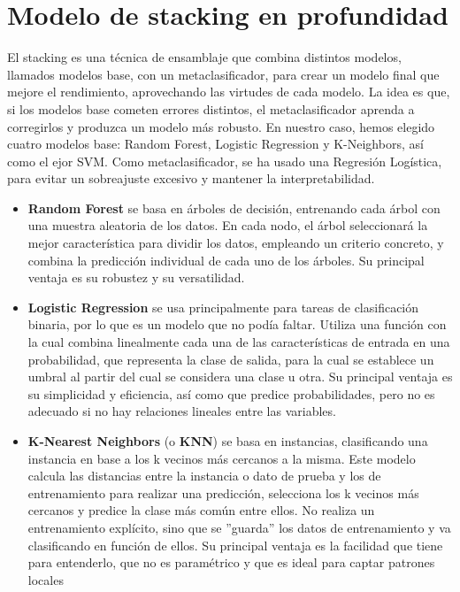 \documentclass[a4paper,onecolumn]{extarticle}
\let\stdsection\section
\renewcommand\section{\newpage\stdsection}
\begin{document}
\begin{sloppypar}
\section{Modelo de stacking en profundidad}\label{stacking}
El stacking es una técnica de ensamblaje que combina distintos modelos, llamados modelos base, con un metaclasificador, para crear un modelo final que mejore el rendimiento, 
aprovechando las virtudes de cada modelo. La idea es que, si los modelos base cometen errores distintos, el metaclasificador aprenda a corregirlos y produzca un modelo más 
robusto. En nuestro caso, hemos elegido cuatro modelos base: Random Forest, Logistic Regression y K-Neighbors, así como el ejor SVM. Como metaclasificador, se ha usado 
una Regresión Logística, para evitar un sobreajuste excesivo y mantener la interpretabilidad.
\begin{itemize}
    \item \textbf{Random Forest} se basa en árboles de decisión, entrenando cada árbol con una muestra aleatoria de los datos. En cada nodo, el árbol seleccionará
    la mejor característica para dividir los datos, empleando un criterio concreto, y combina la predicción individual de cada uno de los árboles. Su principal 
    ventaja es su robustez y su versatilidad.
    \item \textbf{Logistic Regression} se usa principalmente para tareas de clasificación binaria, por lo que es un modelo que no podía faltar. Utiliza una función
    con la cual combina linealmente cada una de las características de entrada en una probabilidad, que representa la clase de salida, para la cual se establece
    un umbral al partir del cual se considera una clase u otra. Su principal ventaja es su simplicidad y eficiencia, así como que predice probabilidades, pero 
    no es adecuado si no hay relaciones lineales entre las variables.
    \item \textbf{K-Nearest Neighbors} (o \textbf{KNN}) se basa en instancias, clasificando una instancia en base a los k vecinos más cercanos a la misma. Este 
    modelo calcula las distancias entre la instancia o dato de prueba y los de entrenamiento para realizar una predicción, selecciona los k vecinos más cercanos 
    y predice la clase más común entre ellos. No realiza un entrenamiento explícito, sino que se ''guarda'' los datos de entrenamiento y va clasificando en función
    de ellos. Su principal ventaja es la facilidad que tiene para entenderlo, que no es paramétrico y que es ideal para captar patrones locales
\end{itemize}


\end{sloppypar}
\end{document}

